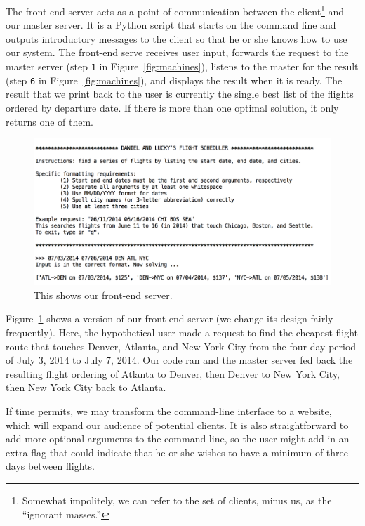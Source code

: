 \documentclass{article}
\begin{document}
The front-end server acts as a point of communication between the client\footnote{Somewhat impolitely, we can refer to the set of clients, minus us,
as the ``ignorant masses.''} and our master server. It is a Python script that starts on the command line and outputs introductory messages to the
client so that he or she knows how to use our system. The front-end serve receives user input, forwards the request to the master server (step
\texttt{1} in Figure~\ref{fig:machines}), listens to the master for the result (step \texttt{6} in Figure~\ref{fig:machines}), and displays the result
when it is ready. The result that we print back to the user is currently the single best list of the flights ordered by departure date. If there is
more than one optimal solution, it only returns one of them.

\begin{figure}[t]
\vskip 0.2in
\begin{center}
\centerline{\includegraphics[width=\columnwidth]{front_end_server}}
\caption{This shows our front-end server.}
\label{fig:front_end_server}
\end{center}
\vskip -0.2in
\end{figure}

Figure~\ref{fig:front_end_server} shows a version of our front-end server (we change its design fairly frequently). Here, the hypothetical user made a
request to find the cheapest flight route that touches Denver, Atlanta, and New York City from the four day period of July 3, 2014 to  July 7, 2014.
Our code ran and the master server fed back the resulting flight ordering of Atlanta to Denver, then Denver to New York City, then New York City back
to Atlanta.

If time permits, we may transform the command-line interface to a website, which will expand our audience of potential clients. It is also
straightforward to add more optional arguments to the command line, so the user might add in an extra flag that could indicate that he or she wishes
to have a minimum of three days between flights.
\end{document}
